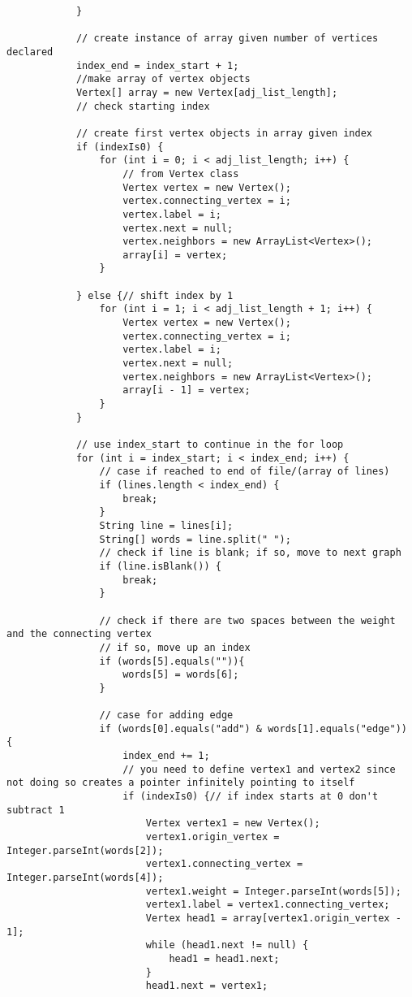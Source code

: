 \documentclass{article}
\begin{document}
\begin{lstlisting}
            }

            // create instance of array given number of vertices declared
            index_end = index_start + 1;
            //make array of vertex objects
            Vertex[] array = new Vertex[adj_list_length];
            // check starting index

            // create first vertex objects in array given index
            if (indexIs0) {
                for (int i = 0; i < adj_list_length; i++) {
                    // from Vertex class
                    Vertex vertex = new Vertex();
                    vertex.connecting_vertex = i;
                    vertex.label = i;
                    vertex.next = null;
                    vertex.neighbors = new ArrayList<Vertex>();
                    array[i] = vertex;
                }

            } else {// shift index by 1
                for (int i = 1; i < adj_list_length + 1; i++) {
                    Vertex vertex = new Vertex();
                    vertex.connecting_vertex = i;
                    vertex.label = i;
                    vertex.next = null;
                    vertex.neighbors = new ArrayList<Vertex>();
                    array[i - 1] = vertex;
                }
            }

            // use index_start to continue in the for loop
            for (int i = index_start; i < index_end; i++) {
                // case if reached to end of file/(array of lines)
                if (lines.length < index_end) {
                    break;
                }
                String line = lines[i];
                String[] words = line.split(" ");
                // check if line is blank; if so, move to next graph
                if (line.isBlank()) {
                    break;
                }

                // check if there are two spaces between the weight and the connecting vertex
                // if so, move up an index
                if (words[5].equals("")){
                    words[5] = words[6];
                }

                // case for adding edge
                if (words[0].equals("add") & words[1].equals("edge")) {
                    index_end += 1;
                    // you need to define vertex1 and vertex2 since not doing so creates a pointer infinitely pointing to itself
                    if (indexIs0) {// if index starts at 0 don't subtract 1
                        Vertex vertex1 = new Vertex();
                        vertex1.origin_vertex = Integer.parseInt(words[2]);
                        vertex1.connecting_vertex = Integer.parseInt(words[4]);
                        vertex1.weight = Integer.parseInt(words[5]);
                        vertex1.label = vertex1.connecting_vertex;
                        Vertex head1 = array[vertex1.origin_vertex - 1];
                        while (head1.next != null) {
                            head1 = head1.next;
                        }
                        head1.next = vertex1;


\end{lstlisting}
\end{document}
